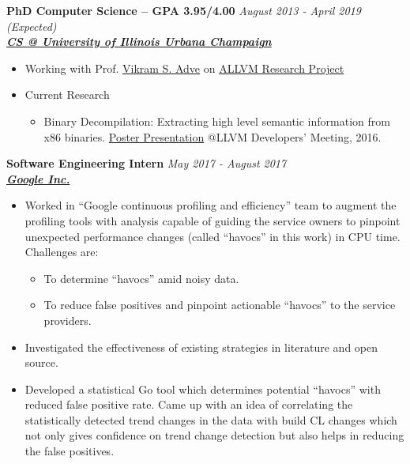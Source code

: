 \documentclass[9pt]{article}
\newenvironment{changemargin}[2]{%
  \begin{list}{}{%
    \setlength{\topsep}{0pt}%
    \setlength{\leftmargin}{#1}%
    \setlength{\rightmargin}{#2}%
    \setlength{\listparindent}{\parindent}%
    \setlength{\itemindent}{\parindent}%
    \setlength{\parsep}{\parskip}%
  }%
  \item[]}{\end{list}
}
\newenvironment{body} {
	\vspace*{-16pt}
	\begin{changemargin}{-0.25in}{-0.5in}
  }	
	{\end{changemargin}
}
\begin{document}
\begin{body}
	\vspace{14pt}

        \textbf{PhD Computer Science -- GPA 3.95/4.00}{} \hfill \emph{August 2013 - April 2019 (Expected)}{} \\
	\textbf{\emph{\href{http://cs.illinois.edu/}{CS @ University of Illinois Urbana Champaign}}{}} \\
	\begin{itemize} \itemsep -0pt
            \item  Working with Prof.
              \href{http://vikram.cs.illinois.edu/}{Vikram S.
              Adve} on \href{https://publish.illinois.edu/allvm-project/}{ALLVM
              Research Project}
          \item  Current Research 
            \begin{itemize} 
              \item   Binary Decompilation: Extracting high level semantic information from x86 binaries.
                \href{https://www.dropbox.com/s/8s20r8pi3eu4knw/allin_poster.pdf?dl=0}{Poster Presentation} @LLVM Developers' Meeting, 2016.
            \end{itemize} 
        \end{itemize}

 \medskip

        \textbf{Software Engineering Intern} \hfill \emph{May 2017 - August 2017}\\
	\textbf{\emph{\href{https://www.google.com/intl/en/about/}{Google Inc.}}}
	\begin{itemize} \itemsep -0pt
		\item  Worked in ``Google continuous profiling and efficiency'' team to augment the
			profiling tools with analysis capable of
			guiding the service owners to pinpoint unexpected
			performance changes (called ``havocs'' in this work) in CPU time. Challenges are:
			\begin{itemize}
				\item To determine ``havocs'' amid noisy data.
				\item To reduce false positives and pinpoint actionable ``havocs'' to the service providers.
			\end{itemize}
		\item Investigated the effectiveness of existing strategies in literature and open source.
		\item
			Developed a statistical Go tool which determines
			potential ``havocs'' with reduced false positive rate.
			Came up with an idea of correlating the
			statistically detected trend changes in the data with
			build CL changes which not only gives confidence on
			trend change detection but also helps in reducing the
			false positives.


\end{itemize}
\end{body}
\end{document}

